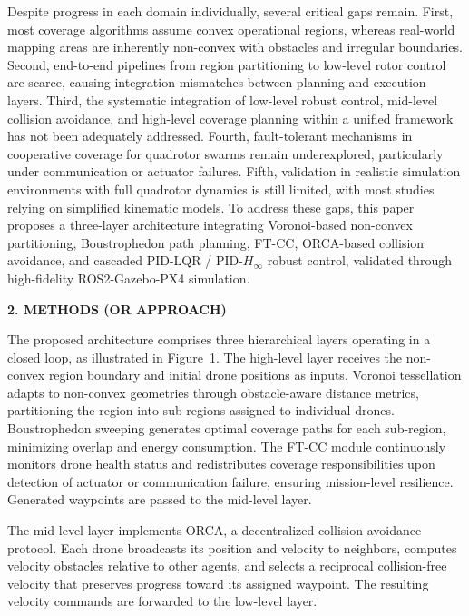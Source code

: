 \documentclass[11pt]{article}
\newcommand{\heading}[1]{%
  \vspace{1.3ex}%
  {\fontsize{10}{12}\bfseries #1}%
  \vspace{0.4ex}%
}
\newcommand{\pbody}{\fontsize{9}{11}\selectfont}
\begin{document}
Despite progress in each domain individually, several critical gaps remain.
First, most coverage algorithms assume convex operational regions, whereas
real-world mapping areas are inherently non-convex with obstacles and
irregular boundaries. Second, end-to-end pipelines from region partitioning
to low-level rotor control are scarce, causing integration mismatches
between planning and execution layers. Third, the systematic integration of
low-level robust control, mid-level collision avoidance, and high-level
coverage planning within a unified framework has not been adequately
addressed. Fourth, fault-tolerant mechanisms in cooperative coverage for
quadrotor swarms remain underexplored, particularly under communication or
actuator failures. Fifth, validation in realistic simulation environments
with full quadrotor dynamics is still limited, with most studies relying on
simplified kinematic models. To address these gaps, this paper proposes a
three-layer architecture integrating Voronoi-based non-convex partitioning,
Boustrophedon path planning, FT-CC, ORCA-based collision avoidance, and
cascaded PID-LQR / PID-$H_\infty$ robust control, validated through high-fidelity
ROS2-Gazebo-PX4 simulation.

\heading{2. METHODS (OR APPROACH)}

\pbody
The proposed architecture comprises three hierarchical layers operating in a
closed loop, as illustrated in Figure~1. The high-level layer receives the
non-convex region boundary and initial drone positions as inputs. Voronoi
tessellation adapts to non-convex geometries through obstacle-aware distance
metrics, partitioning the region into sub-regions assigned to individual
drones. Boustrophedon sweeping generates optimal coverage paths for each
sub-region, minimizing overlap and energy consumption. The FT-CC module
continuously monitors drone health status and redistributes coverage
responsibilities upon detection of actuator or communication failure,
ensuring mission-level resilience. Generated waypoints are passed to the
mid-level layer.

The mid-level layer implements ORCA, a decentralized collision avoidance
protocol. Each drone broadcasts its position and velocity to neighbors,
computes velocity obstacles relative to other agents, and selects a
reciprocal collision-free velocity that preserves progress toward its
assigned waypoint. The resulting velocity commands are forwarded to the
low-level layer.
\end{document}
